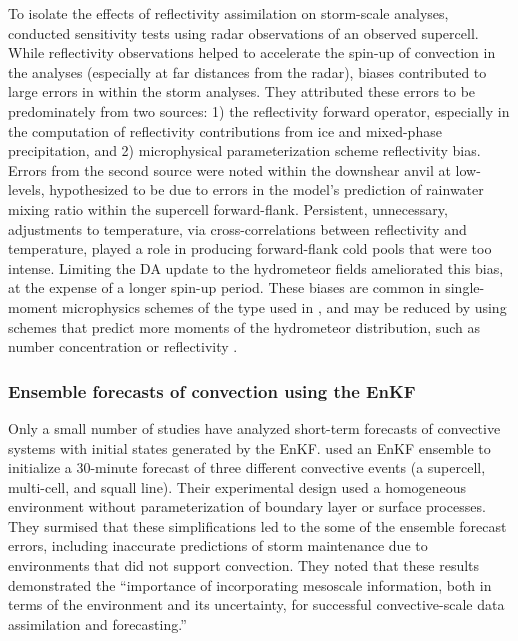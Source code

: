 To isolate the effects of reflectivity assimilation on storm-scale analyses, \citet{dowelletal11} conducted sensitivity tests using radar observations of an observed supercell. While reflectivity observations helped to accelerate the spin-up of convection in the analyses (especially at far distances from the radar), biases contributed to large errors in within the storm analyses. They attributed these errors to be predominately from two sources: 1) the reflectivity forward operator, especially in the computation of reflectivity contributions from ice and mixed-phase precipitation, and 2) microphysical parameterization scheme reflectivity bias. Errors from the second source were noted within the downshear anvil at low-levels, hypothesized to be due to errors in the model’s prediction of rainwater mixing ratio within the supercell forward-flank. Persistent, unnecessary, adjustments to temperature, via cross-correlations between reflectivity and temperature, played a role in producing forward-flank cold pools that were too intense. Limiting the DA update to the hydrometeor fields ameliorated this bias, at the expense of a longer spin-up period. These biases are common in single-moment microphysics schemes of the type used in \citet{dowelletal11}, and may be reduced by using schemes that predict more moments of the hydrometeor distribution, such as number concentration or reflectivity \citep{dawsonetal10}.

\subsubsection{Ensemble forecasts of convection using the EnKF}
Only a small number of studies have analyzed short-term forecasts of convective systems with initial states generated by the EnKF. \citet{aksoyetal10} used an EnKF ensemble to initialize a 30-minute forecast of three different convective events (a supercell, multi-cell, and squall line). Their experimental design used a homogeneous environment without parameterization of boundary layer or surface processes. They surmised that these simplifications led to the some of the ensemble forecast errors, including inaccurate predictions of storm maintenance due to environments that did not support convection. They noted that these results demonstrated the “importance of incorporating mesoscale information, both in terms of the environment and its uncertainty, for successful convective-scale data assimilation and forecasting.” 

